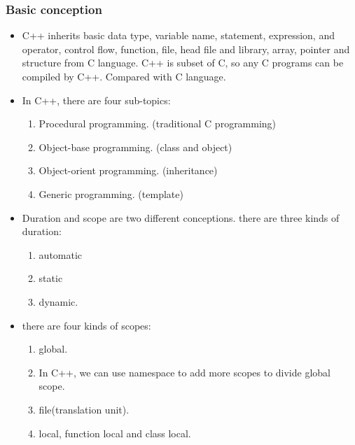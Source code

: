 \documentclass[a4paper,12pt,twoside]{book}
\begin{document}
\subsubsection{Basic conception}
\begin{itemize}
    \item C++ inherits basic data type, variable name, statement, expression, and operator, control flow, function, file, head file and library, array, pointer and structure from C language. C++ is subset of C, so any C programs can be compiled by C++. Compared with C language.
    
    \item In C++, there are four sub-topics: 
    
    \begin{enumerate}
        \item Procedural programming. (traditional C programming)
        \item Object-base programming. (class and object)
        \item Object-orient programming. (inheritance)
        \item Generic programming. (template)
    \end{enumerate}
    
    \item Duration and scope are two different conceptions. there are three kinds of duration:
    \begin{enumerate}
        \item automatic 
        \item static 
        \item dynamic. 
    \end{enumerate}
    
    \item there are four kinds of scopes:
    \begin{enumerate}
        \item global.
        \item In C++, we can use namespace to add more scopes to divide global scope.
        \item file(translation unit).
        \item local, function local and class local. 
    \end{enumerate}
    
\end{itemize}
\end{document}
